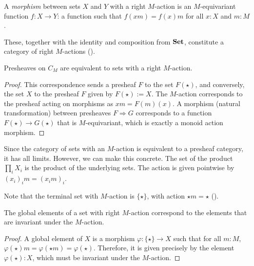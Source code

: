\begin{definition}
  A \textit{morphism} between sets $ X $ and $ Y $ with a right $ M $-action is an $ M $-equivariant function $ f: X \to Y $: a function such that $ f(xm) = f(x)m $ for all $ x: X $ and $ m: M $.
\end{definition}

These, together with the identity and composition from $ \mathbf{Set} $, constitute a category  of right $ M $-actions ().

\begin{lemma}
  Presheaves on $ C_M $ are equivalent to sets with a right $ M $-action.
\end{lemma}
\begin{proof}
  This correspondence sends a presheaf $ F $ to the set $ F(\star) $, and conversely, the set $ X $ to the presheaf $ F $ given by $ F(\star) := X $. The $ M $-action corresponds to the presheaf acting on morphisms as $ xm = F(m)(x) $. A morphism (natural transformation) between presheaves $ F \Rightarrow G $ corresponds to a function $ F(\star) \to G(\star) $ that is $ M $-equivariant, which is exactly a monoid action morphism.
\end{proof}

\begin{remark}
  Since the category of sets with an $ M $-action is equivalent to a presheaf category, it has all limits. However, we can make this concrete. The set of the product $ \prod_i X_i $ is the product of the underlying sets. The action is given pointwise by $ (x_i)_i m = (x_i m)_i $.
\end{remark}

Note that the terminal set with $ M $-action is $ \{ \star \} $, with action $ \star m = \star $ ().

\begin{lemma}\label{lem:global-action-elements}
  The global elements of a set with right $ M $-action correspond to the elements that are invariant under the $ M $-action.
\end{lemma}
\begin{proof}
  A global element of $ X $ is a morphism $ \varphi: \{ \star \} \to X $ such that for all $ m: M $, $ \varphi(\star)m = \varphi(\star m) = \varphi(\star) $. Therefore, it is given precisely by the element $ \varphi(\star): X $, which must be invariant under the $ M $-action.
\end{proof}

